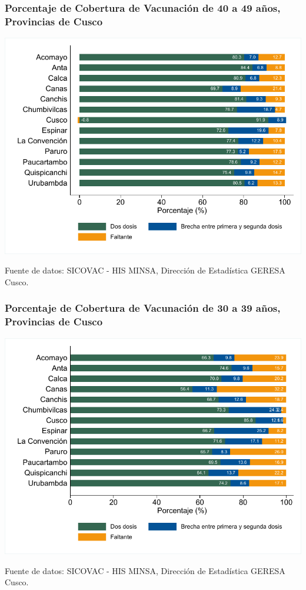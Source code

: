 \documentclass[xcolor=table]{beamer}
\begin{document}
\begin{frame}[label=vacunas_40]
	\frametitle{Porcentaje de Cobertura de Vacunación de 40 a 49 años, Provincias de Cusco}
	\vspace{-.5cm}
	\begin{center}
		\includegraphics[width=0.8\linewidth, trim={.2cm .5cm .2cm .2cm},clip]{../figuras/vacunacion_provincial_edad_5.pdf}
	\end{center}
	{\tiny Fuente de datos: SICOVAC - HIS MINSA, Dirección de Estadística GERESA Cusco. \\}
\hyperlink{cobertura_vacuna_provincias}{}
\end{frame}

\begin{frame}[label=vacunas_30]
	\frametitle{Porcentaje de Cobertura de Vacunación de 30 a 39 años, Provincias de Cusco}
	\vspace{-.5cm}
	\begin{center}
		\includegraphics[width=0.8\linewidth, trim={.2cm .5cm .2cm .2cm},clip]{../figuras/vacunacion_provincial_edad_4.pdf}
	\end{center}
	{\tiny Fuente de datos: SICOVAC - HIS MINSA, Dirección de Estadística GERESA Cusco. \\}
\hyperlink{cobertura_vacuna_provincias}{}
\end{frame}
\end{document}
